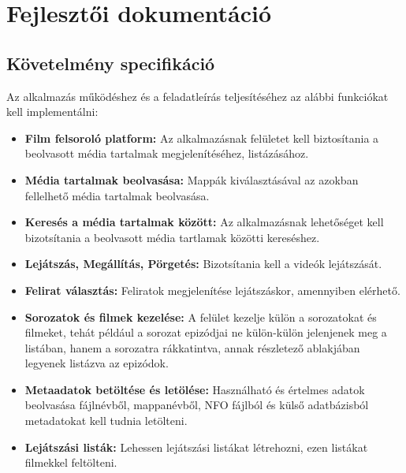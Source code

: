 \chapter{Fejlesztői dokumentáció} %
\label{ch:dev}

\section{Követelmény specifikáció}
Az alkalmazás működéshez és a feladatleírás teljesítéséhez az alábbi funkciókat kell implementálni:
\begin{itemize}
    \item {\textbf {Film felsoroló platform: }} Az alkalmazásnak felületet kell biztosítania a beolvasott média tartalmak megjelenítéséhez, listázásához.
    \item {\textbf {Média tartalmak beolvasása: }} Mappák kiválasztásával az azokban fellelhető média tartalmak beolvasása.
	\item {\textbf {Keresés a média tartalmak között: }} Az alkalmazásnak lehetőséget kell bizotsítania a beolvasott média tartlamak közötti kereséshez.
	\item {\textbf {Lejátszás, Megállítás, Pörgetés: }} Bizotsítania kell a videók lejátszását.
	\item {\textbf {Felirat választás: }} Feliratok megjelenítése lejátszáskor, amennyiben elérhető.
	\item {\textbf {Sorozatok és filmek kezelése: }} A felület kezelje külön a sorozatokat és filmeket, tehát például a sorozat epizódjai ne külön-külön jelenjenek meg a listában, hanem a sorozatra rákkatintva, annak részletező ablakjában legyenek listázva az epizódok.
	\item {\textbf {Metaadatok betöltése és letölése: }} Használható és értelmes adatok beolvasása fájlnévből, mappanévből, NFO fájlból és külső adatbázisból metadatokat kell tudnia letölteni.
    \item {\textbf {Lejátszási listák: }} Lehessen lejátszási listákat létrehozni, ezen listákat filmekkel feltölteni.
\end{itemize}

